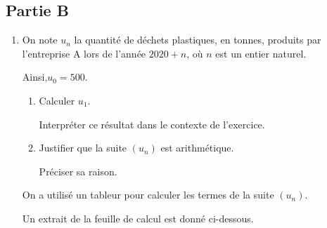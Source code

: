 \subsection*{Partie B}

\begin{enumerate}
\item On note $u_{n}$ la quantité de déchets plastiques, en tonnes, produits par l'entreprise A lors de l'année $2020+n$, où $n$ est un entier naturel.

Ainsi,\quad $u_{0}=500$.
	\begin{enumerate}
		\item Calculer $u_{1}$.

		Interpréter ce résultat dans le contexte de l'exercice.

		\item Justifier que la suite $(u_{n})$ est arithmétique.

		Préciser sa raison.

	\end{enumerate}
		On a utilisé un tableur pour calculer les termes de la suite $(u_{n})$.

		Un extrait de la feuille de calcul est donné ci-dessous.

\begin{center}


\end{center}
\end{enumerate}
